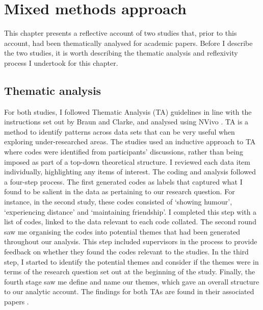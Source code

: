 \section{Mixed methods approach}
\label{mixed-methods}
This chapter presents a reflective account of two studies that, prior to this account, had been thematically analysed for academic papers. Before I describe the two studies, it is worth describing the thematic analysis and reflexivity process I undertook for this chapter.

\subsection{Thematic analysis}
\label{CH4:TA}
For both studies, I followed Thematic Analysis (TA) guidelines in line with the instructions set out by Braun and Clarke, and analysed using NVivo \citep{braun_using_2006,braun_what_2014}. TA is a method to identify patterns across data sets that can be very useful when exploring under-researched areas. The studies used an inductive approach to TA where codes were identified from participants' discussions, rather than being imposed as part of a top-down theoretical structure. I reviewed each data item individually, highlighting any items of interest. The coding and analysis followed a four-step process. The first generated codes as labels that captured what I found to be salient in the data as pertaining to our research question. For instance, in the second study, these codes consisted of `showing humour', `experiencing distance' and `maintaining friendship'. I completed this step with a list of codes, linked to the data relevant to each code collated. The second round saw me organising the codes into potential themes that had been generated throughout our analysis. This step included supervisors in the process to provide feedback on whether they found the codes relevant to the studies. In the third step, I started to identify the potential themes and consider if the themes were  in terms of the research question set out at the beginning of the study. Finally, the fourth stage saw me define and name our themes, which gave an overall structure to our analytic account. The findings for both TAs are found in their associated papers \citep{hodge_exploring_2018,hodge_exploring_2019}.

